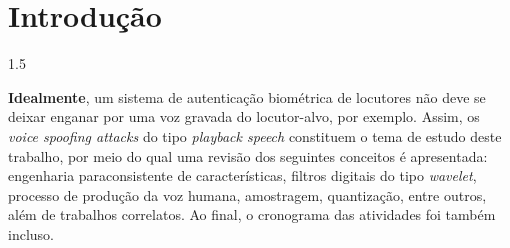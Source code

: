 \documentclass[a4paper,12pt,openright,oneside]{book}
\newenvironment{myenv}[1]
{\begin{spacing}{#1}}
	{\end{spacing}}
\begin{document}
\cleardoublepage
{}
\listoffigures
\cleardoublepage
{}
\listoftables
\frontmatter
\def\contentsname{Sumário} 
\tableofcontents
\cleardoublepage
\mainmatter
\setlength{\parindent}{1.25cm}

\chapter{Introdução}
\begin{myenv}{1.5}
\setcounter{page}{12}
\par \textbf{Idealmente}, um sistema de autenticação biométrica de locutores não deve se deixar enganar por uma voz gravada do locutor-alvo, por exemplo. Assim, os \textit{voice spoofing attacks} do tipo \textit{playback speech} constituem o tema de estudo deste trabalho, por meio do qual uma revisão dos seguintes conceitos é apresentada: engenharia paraconsistente de características, filtros digitais do tipo \textit{wavelet}, processo de produção da voz humana, amostragem, quantização, entre outros, além de trabalhos correlatos. Ao final, o cronograma das atividades foi também incluso.
\end{myenv}
\end{document}
